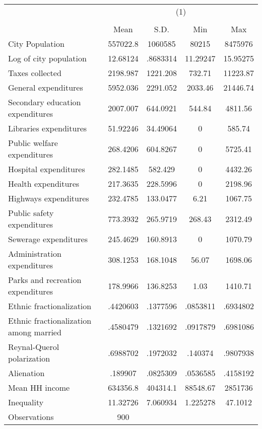 {
\def\sym#1{\ifmmode^{#1}\else\(^{#1}\)\fi}
\begin{tabular}{l*{1}{cccc}}
\hline\hline
                    &\multicolumn{4}{c}{(1)}                            \\
                    &\multicolumn{4}{c}{}                               \\
                    &        Mean&          S.D.&         Min&         Max\\
\hline
City Population     &    557022.8&     1060585&       80215&     8475976\\
Log of city population&    12.68124&    .8683314&    11.29247&    15.95275\\
Taxes collected     &    2198.987&    1221.208&      732.71&    11223.87\\
General expenditures&    5952.036&    2291.052&     2033.46&    21446.74\\
Secondary education expenditures&    2007.007&    644.0921&      544.84&     4811.56\\
Libraries expenditures&    51.92246&    34.49064&           0&      585.74\\
Public welfare expenditures&    268.4206&    604.8267&           0&     5725.41\\
Hospital expenditures&    282.1485&     582.429&           0&     4432.26\\
Health expenditures &    217.3635&    228.5996&           0&     2198.96\\
Highways expenditures&    232.4785&    133.0477&        6.21&     1067.75\\
Public safety expenditures&    773.3932&    265.9719&      268.43&     2312.49\\
Sewerage expenditures&    245.4629&    160.8913&           0&     1070.79\\
Administration expenditures&    308.1253&    168.1048&       56.07&     1698.06\\
Parks and recreation expenditures&    178.9966&    136.8253&        1.03&     1410.71\\
Ethnic fractionalization&    .4420603&    .1377596&    .0853811&    .6934802\\
Ethnic fractionalization among married&    .4580479&    .1321692&    .0917879&    .6981086\\
Reynal-Querol polarization&    .6988702&    .1972032&     .140374&    .9807938\\
Alienation          &     .189907&    .0825309&    .0536585&    .4158192\\
Mean HH income      &    634356.8&    404314.1&    88548.67&     2851736\\
Inequality          &    11.32726&    7.060934&    1.225278&     47.1012\\
\hline
Observations        &         900&            &            &            \\
\hline\hline
\end{tabular}
}
